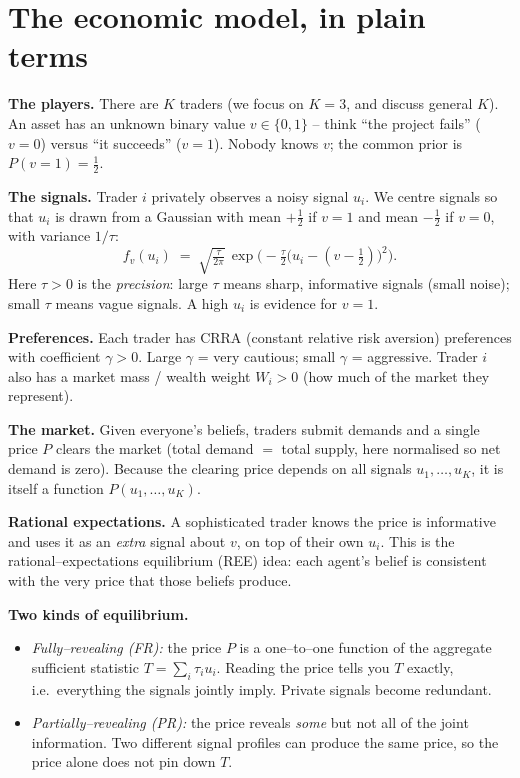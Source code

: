\documentclass[11pt]{article}
\begin{document}
\tableofcontents

\section{The economic model, in plain terms}

\textbf{The players.} There are $K$ traders (we focus on $K=3$, and discuss
general $K$). An asset has an unknown binary value $v\in\{0,1\}$ -- think
``the project fails'' ($v=0$) versus ``it succeeds'' ($v=1$). Nobody knows
$v$; the common prior is $P(v=1)=\tfrac12$.

\textbf{The signals.} Trader $i$ privately observes a noisy signal $u_i$.
We centre signals so that $u_i$ is drawn from a Gaussian with mean $+\tfrac12$
if $v=1$ and mean $-\tfrac12$ if $v=0$, with variance $1/\tau$:
\begin{equation}
  f_v(u_i) \;=\; \sqrt{\tfrac{\tau}{2\pi}}\,
  \exp\!\Big(-\tfrac{\tau}{2}\big(u_i-(v-\tfrac12)\big)^2\Big).
  \label{eq:fsignal}
\end{equation}
Here $\tau>0$ is the \emph{precision}: large $\tau$ means sharp,
informative signals (small noise); small $\tau$ means vague signals. A high
$u_i$ is evidence for $v=1$.

\textbf{Preferences.} Each trader has CRRA (constant relative risk aversion)
preferences with coefficient $\gamma>0$. Large $\gamma$ = very cautious;
small $\gamma$ = aggressive. Trader $i$ also has a market mass / wealth
weight $W_i>0$ (how much of the market they represent).

\textbf{The market.} Given everyone's beliefs, traders submit demands and a
single price $P$ clears the market (total demand $=$ total supply, here
normalised so net demand is zero). Because the clearing price depends on all
signals $u_1,\dots,u_K$, it is itself a function $P(u_1,\dots,u_K)$.

\textbf{Rational expectations.} A sophisticated trader knows the price is
informative and uses it as an \emph{extra} signal about $v$, on top of their
own $u_i$. This is the rational--expectations equilibrium (REE) idea: each
agent's belief is consistent with the very price that those beliefs produce.

\textbf{Two kinds of equilibrium.}
\begin{itemize}
\item \emph{Fully--revealing (FR):} the price $P$ is a one--to--one function
  of the aggregate sufficient statistic $T=\sum_i \tau_i u_i$. Reading the
  price tells you $T$ exactly, i.e.\ everything the signals jointly imply.
  Private signals become redundant.
\item \emph{Partially--revealing (PR):} the price reveals \emph{some} but not
  all of the joint information. Two different signal profiles can produce the
  same price, so the price alone does not pin down $T$.
\end{itemize}
\end{document}
